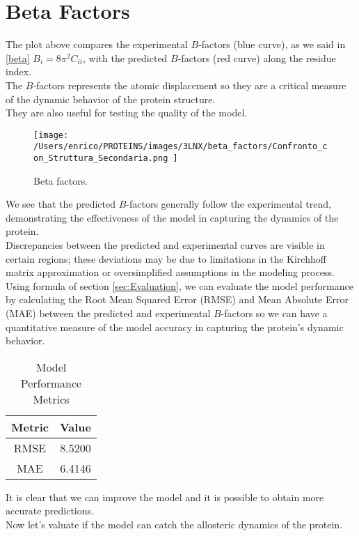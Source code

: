 \documentclass[English, Lau, oneside]{sapthesis}
\begin{document}
\section{Beta Factors}
\noindent The plot above compares the experimental \( B \)-factors (blue curve), as we said in \eqref{beta} $B_i = 8\pi^2 C_{ii}$, with the predicted \( B \)-factors (red curve) along the residue index. \\
The \( B \)-factors represents the atomic displacement so they are a critical measure of the dynamic behavior of the protein structure. \\
They are also useful for testing the quality of the model.\\
\begin{figure}[h!]
    \centering
    \texttt{[image: /Users/enrico/PROTEINS/images/3LNX/beta\_factors/Confronto\_con\_Struttura\_Secondaria.png
    ]}
    \caption{Beta factors.}
\end{figure}
We see that the predicted \( B \)-factors generally follow the experimental trend, demonstrating the effectiveness of the model in capturing the dynamics of the protein.\\
Discrepancies between the predicted and experimental curves are visible in certain regions; these deviations may be due to limitations in the Kirchhoff matrix approximation or oversimplified assumptions in the modeling process.\\
Using formula of section \ref{sec:Evaluation}, we can evaluate the model performance by calculating the Root Mean Squared Error (RMSE) and Mean Absolute Error (MAE) between the predicted and experimental \( B \)-factors so we can have a quantitative measure of the model accuracy in capturing the protein's dynamic behavior.\\
\begin{table}[h!]
    \centering
    \begin{tabular}{|c|c|}
    \hline
    \textbf{Metric} & \textbf{Value} \\ \hline
    RMSE & 8.5200 \\ \hline
    MAE  & 6.4146 \\ \hline
    \end{tabular}
    \caption{Model Performance Metrics}
    \label{tab:model_metrics}
\end{table}
It is clear that we can improve the model and it is possible to obtain more accurate predictions.\\
Now let's valuate if the model can catch the allosteric dynamics of the protein.\\
\newpage
\end{document}
